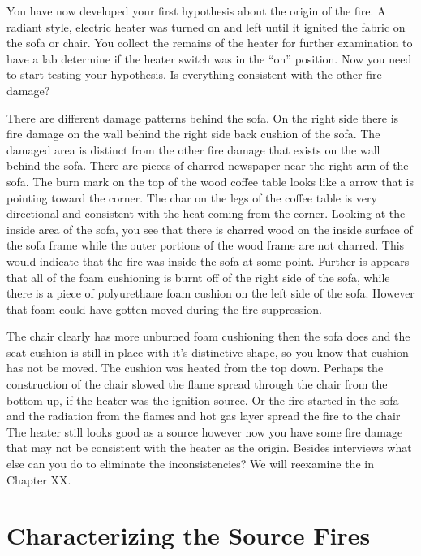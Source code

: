 \documentclass[twoside]{uocthesis}
\begin{document}
{You have now developed your first hypothesis about the origin of the fire.  A radiant style, electric heater was turned on and left until it ignited the fabric on the sofa or chair.  You collect the remains of the heater for further examination to have a lab determine if the heater switch was in the ``on'' position.  Now you need to start testing your hypothesis.  Is everything consistent with the other fire damage?  

There are different damage patterns behind the sofa.  On the right side there is fire damage on the wall behind the right side back cushion of the sofa. The damaged area is distinct from the other fire damage that exists on the wall behind the sofa. There are pieces of charred newspaper near the right arm of the sofa.  The burn mark on the top of the wood coffee table looks like a arrow that is pointing toward the corner.  The char on the legs of the coffee table is very directional and consistent with the heat coming from the corner.  Looking at the inside area of the sofa, you see that there is charred wood on the inside surface of the sofa frame while the outer portions of the wood frame are not charred.  This would indicate that the fire was inside the sofa at some point.  Further is appears that all of the foam cushioning is burnt off of the right side of the sofa, while there is a piece of polyurethane foam cushion on the left side of the sofa.  However that foam could have gotten moved during the fire suppression. 

The chair clearly has more unburned foam cushioning then the sofa does and the seat cushion is still in place with it's distinctive shape, so you know that cushion has not be moved.  The cushion was heated from the top down.  Perhaps the construction of the chair slowed the flame spread through the chair from the bottom up, if the heater was the ignition source.  Or the fire started in the sofa and the radiation from the flames and hot gas layer spread the fire to the chair  The heater still looks good as a source however now you have some fire damage that may not be consistent with the heater as the origin.  Besides interviews what else can you do to eliminate the inconsistencies?   We will reexamine the in Chapter XX.     

\chapter{Characterizing the Source Fires}
\label{chapter:Characterizing the Source Fires}

}
\end{document}
